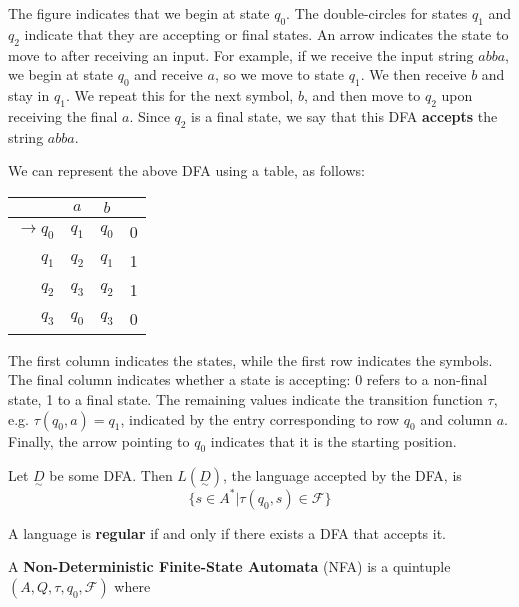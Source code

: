 The figure indicates that we begin at state \(q_0\). The double-circles for states \(q_1\) and \(q_2\) indicate that they are accepting or final states. An arrow indicates the state to move to after receiving an input. For example, if we receive the input string \(abba\), we begin at state \(q_0\) and receive \(a\), so we move to state \(q_1\). We then receive \(b\) and stay in \(q_1\). We repeat this for the next symbol, \(b\), and then move to \(q_2\) upon receiving the final \(a\). Since \(q_2\) is a final state, we say that this DFA \textbf{accepts} the string \(abba\). 

We can represent the above DFA using a table, as follows:

\begin{center}\begin{tabular}{r|c c r}
         & \(a\) & \(b\) & \\\bottomrule
    \(\to q_0\) & \(q_1\) & \(q_0\) & 0 \\
    \(q_1\) & \(q_2\) & \(q_1\) & 1 \\
    \(q_2\) & \(q_3\) & \(q_2\) & 1\\
    \(q_3\) & \(q_0\) & \(q_3\) & 0\\
\end{tabular}\end{center}

The first column indicates the states, while the first row indicates the symbols. The final column indicates whether a state is accepting: 0 refers to a non-final state, 1 to a final state. The remaining values indicate the transition function \(\tau\), e.g. \(\tau(q_0, a)=q_1\), indicated by the entry corresponding to row \(q_0\) and column \(a\). Finally, the arrow pointing to \(q_0\) indicates that it is the starting position. 

\begin{definition}
Let \(\underset{\sim}{D}\) be some DFA. Then \(L(\underset{\sim}{D})\), the language accepted by the DFA, is \[\{s\in A^*|\tau(q_0, s)\in \mathcal{F}\}\]
\end{definition}

\begin{definition}
A language is \textbf{regular} if and only if there exists a DFA that accepts it.
\end{definition}

\begin{definition}
A \textbf{Non-Deterministic Finite-State Automata} (NFA) is a quintuple \((A, Q, \tau, q_0, \mathcal{F})\) where 
\end{definition}

